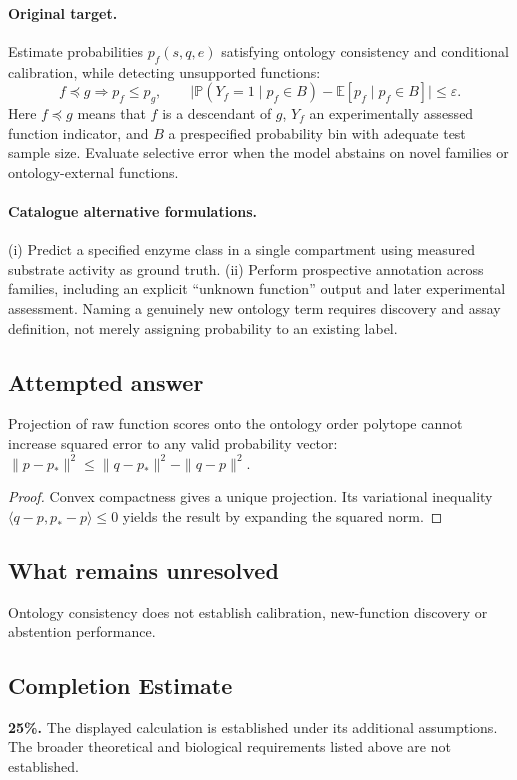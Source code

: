 \documentclass[11pt]{article}
\begin{document}
\paragraph{Original target.}
Estimate probabilities $p_f(s,q,e)$ satisfying ontology consistency and conditional calibration, while detecting unsupported functions:
\[f\preceq g\Longrightarrow p_f\le p_g,\qquad \big|\mathbb{P}(Y_f=1\mid p_f\in B)-\mathbb{E}[p_f\mid p_f\in B]\big|\le\varepsilon.\]
Here $f\preceq g$ means that $f$ is a descendant of $g$, $Y_f$ an experimentally assessed function indicator, and $B$ a prespecified probability bin with adequate test sample size. Evaluate selective error when the model abstains on novel families or ontology-external functions.
\paragraph{Catalogue alternative formulations.}
(i) Predict a specified enzyme class in a single compartment using measured substrate activity as ground truth. (ii) Perform prospective annotation across families, including an explicit ``unknown function'' output and later experimental assessment. Naming a genuinely new ontology term requires discovery and assay definition, not merely assigning probability to an existing label.
\subsection{Attempted answer}
\begin{proposition}
Projection of raw function scores onto the ontology order polytope cannot increase squared error to any valid probability vector: $\|p-p_*\|^2\leq\|q-p_*\|^2-\|q-p\|^2$.
\end{proposition}
\begin{proof}
Convex compactness gives a unique projection. Its variational inequality $\langle q-p,p_*-p\rangle\leq0$ yields the result by expanding the squared norm.
\end{proof}
\subsection{What remains unresolved}
Ontology consistency does not establish calibration, new-function discovery or abstention performance.
\subsection{Completion Estimate}
\textbf{25\%.} The displayed calculation is established under its additional assumptions. The broader theoretical and biological requirements listed above are not established.
\end{document}
